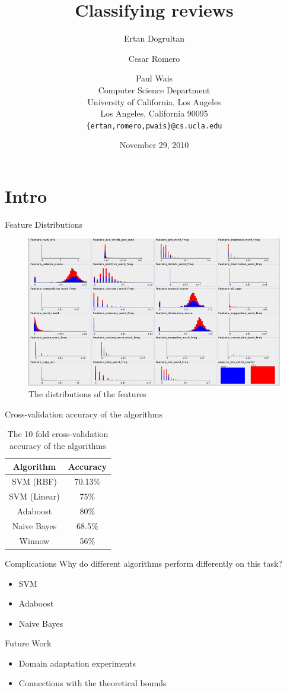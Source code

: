\documentclass{beamer}
\title{Classifying reviews}
\author{Ertan Dogrultan \and Cesar Romero \and Paul Wais\\
Computer Science Department \\
University of California, Los Angeles\\
Los Angeles, California 90095\\
\texttt{\{ertan,romero,pwais\}@cs.ucla.edu}}
\date{November 29, 2010}
\begin{document}
\maketitle{}
\tableofcontents{}

\section{Intro}
\label{sec:intro}

\begin{frame}{Feature Distributions}
\begin{figure}[h]
  \centering
  \includegraphics[scale=.4]{features_distributions}
  \caption{The distributions of the features}
  \label{fig:dist}
\end{figure}
\end{frame}

\begin{frame}{Cross-validation accuracy of the algorithms}
\begin{table}[ht]
  \centering
  \begin{tabular}{c | c}
    Algorithm & Accuracy\\
    \hline
    SVM (RBF) & 70.13\%\\
    SVM (Linear) & 75\% \\
    Adaboost & 80\%\\
    Naive Bayes & 68.5\%\\
    Winnow & 56\%\\
  \end{tabular}
  \caption{The 10 fold cross-validation accuracy of the algorithms}
  \label{tab:performance}
\end{table}
\end{frame}

\begin{frame}{Complications}
Why do different algorithms perform differently on this task?
\begin{itemize}
\item SVM
\item Adaboost
\item Naive Bayes 
\end{itemize}
\end{frame}

\begin{frame}{Future Work}
\begin{itemize}
\item Domain adaptation experiments
\begin{figure}[ht]
\centering
\label{fig:adaptation}
\end{figure}
\item Connections with the theoretical bounds
\end{itemize}

\end{frame}
\end{document}

